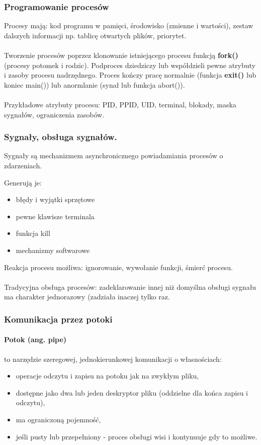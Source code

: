 \documentclass[a4paper,twoside]{report}
\begin{document}
\subsubsection{Programowanie procesów}
Procesy mają: kod programu w pamięci, środowisko (zmienne i wartości), zestaw dalszych informacji np. tablicę otwartych plików, priorytet. \\
\\
Tworzenie procesów poprzez klonowanie istniejącego procesu funkcją \textbf{fork()} (procesy potomek i rodzic). Podproces dziedziczy lub współdzieli pewne atrybuty i zasoby procesu nadrzędnego. Proces kończy pracę normalnie (funkcja \textbf{exit()} lub koniec main()) lub anormlanie (synał lub funkcja abort()).\\ 
\\
Przykładowe atrybuty procesu:  PID, PPID, UID, terminal, blokady, maska sygnałów, ograniczenia zasobów.

\subsubsection{Sygnały, obsługa sygnałów.}

Sygnały są mechanizmem asynchronicznego powiadamiania procesów o zdarzeniach. 

Generują je:
\begin{itemize}
	\item błędy i wyjątki sprzętowe
	\item pewne klawisze terminala
	\item funkcja kill
	\item mechanizmy softwarowe
\end{itemize}

Reakcja procesu możliwa: ignorowanie, wywołanie funkcji, śmierć procesu.\\
\\
Tradycyjna obsługa procesów: zadeklarowanie innej niż domyślna obsługi sygnału ma charakter jednorazowy (zadziała inaczej tylko raz.

\subsubsection{Komunikacja przez potoki}
\paragraph{Potok (ang. pipe)} to narzędzie szeregowej, jednokierunkowej komunikacji o własnościach:
\begin{itemize}
	\item operacje odczytu i zapisu na potoku jak na zwykłym pliku,
	\item dostępne jako dwa lub jeden deskryptor pliku (oddzielne dla końca zapisu i odczytu),
	\item ma ograniczoną pojemność,
	\item jeśli pusty lub przepełniony - proces obsługi wisi i kontynuuje gdy to możliwe.	
\end{itemize}
\end{document}
